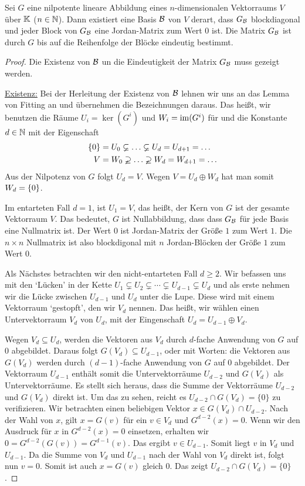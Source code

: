 \begin{thm}
	Sei $ G $ eine nilpotente lineare Abbildung eines $ n $-dimensionalen Vektorraums $ V $ über $ \mathbb K $ ($ n \in \mathbb N $). Dann existiert eine Basis $ \mathcal{B} $ von $ V $ derart, dass $ G_{\mathcal{B}} $ blockdiagonal und jeder Block von $ G_{\mathcal{B}} $ eine Jordan-Matrix zum Wert 0 ist. Die Matrix $ G_{\mathcal{B}} $ ist durch $ G $ bis auf die Reihenfolge der Blöcke eindeutig bestimmt.
\end{thm}
\begin{proof} Die Existenz von $\mathcal{B}$ un die Eindeutigkeit der Matrix $G_{\mathcal{B}}$ muss gezeigt werden. 
	
	\underline{Existenz:} Bei der Herleitung der Existenz von $\mathcal{B}$ lehnen wir uns an das Lemma von Fitting an und übernehmen die Bezeichnungen daraus. 
	Das heißt, wir benutzen die Räume $ U_i = \ker(G^i) $ und $ W_i = \operatorname{im}(G^i) $ für und die Konstante $ d \in \mathbb N $ mit der Eigenschaft 
	\begin{align*}
		\left\{ 0 \right\} &= U_0 \varsubsetneq \ldots \varsubsetneq U_d = U_{d+1} = \ldots \\
		V &= W_0 \varsupsetneq \ldots \varsupsetneq W_d = W_{d+1} = \ldots
	\end{align*}
	Aus der Nilpotenz von $ G $ folgt $ U_d = V $. Wegen $ V = U_d \oplus W_d $ hat man somit $W_d = \left\{ 0 \right\}$. 
	
	Im entarteten Fall $d=1$, ist $U_1 = V$, das heißt, der Kern von $G$ ist der gesamte Vektorraum $V$. Das bedeutet, $G$ ist Nullabbildung, dass dass $G_{\mathcal{B}}$ für jede Basis eine Nullmatrix ist. Der Wert $0$ ist Jordan-Matrix der Größe $1$ zum Wert $1$. Die $n \times n$ Nullmatrix ist also blockdigonal mit $n$ Jordan-Blöcken der Größe $1$ zum Wert $0$. 
	
	Als Nächstes betrachten wir den nicht-entarteten Fall $d \ge 2$. Wir befassen uns   mit den `Lücken' in der Kette $U_1 \varsubsetneq U_2 \varsubsetneq \cdots \varsubsetneq U_{d-1} \varsubsetneq U_d$  und als erste nehmen wir die Lücke zwischen $U_{d-1}$ und $U_d$ unter die Lupe. Diese wird mit einem Vektorraum `gestopft', den wir $V_d$ nennen. Das heißt, wir wählen einen Untervektorraum $V_d$ von $U_d$, mit der Eingenschaft $U_d = U_{d-1} \oplus V_d$. 
	
	Wegen $V_d \subseteq U_d$, werden die Vektoren aus $V_d$ durch $d$-fache Anwendung von $G$ auf $0$ abgebildet. Daraus folgt $G(V_d) \subseteq U_{d-1}$, oder mit Worten: die Vektoren aus $G(V_d)$ werden durch $(d-1)$-fache Anwendung von $G$ auf $0$ abgebildet. Der Vektorraum $U_{d-1}$ enthält somit die Untervektorräume $U_{d-2}$ und $G(V_d)$ als Untervektorräume. Es stellt sich heraus, dass die Summe der Vektorräume $U_{d-2} $und $G(V_d)$ direkt ist. Um das zu sehen, reicht es $U_{d-2} \cap G(V_d) =\{0\}$ zu verifizieren. Wir betrachten einen beliebigen Vektor $x \in G(V_d) \cap U_{d-2}$. Nach der Wahl von $x$, gilt $x = G(v)$ für ein $v \in V_d$ und $G^{d-2} (x) = 0$. Wenn wir den Ausdruck für $x$ in $G^{d-2} (x) = 0$ einsetzen, erhalten wir $0 = G^{d-2}(G(v)) = G^{d-1}(v)$. Das ergibt $v \in U_{d-1}$. Somit liegt $v$ in $V_d$ und $U_{d-1}$. Da die Summe von $V_d$ und $U_{d-1}$ nach der Wahl von $V_d$ direkt ist, folgt nun $v=0$. Somit ist auch $x = G(v)$ gleich $0$. Das zeigt $U_{d-2} \cap G(V_d) = \{0\}$. 
	

\end{proof}
